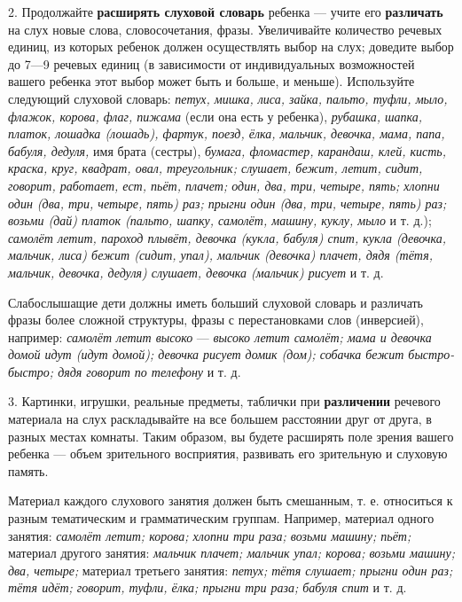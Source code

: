 \documentclass[a5paper]{book}
\renewcommand{\emph}[1]{\textit{#1}}
\begin{document}
2. Продолжайте \textbf{расширять слуховой словарь} ребенка --- учите его
\textbf{различать} на слух новые слова, словосочетания, фразы.
Увеличивайте количество речевых единиц, из которых ребенок должен
осуществлять выбор на слух; доведите выбор до 7---9 речевых единиц (в
зависимости от индивидуальных возможностей вашего ребенка этот выбор
может быть и больше, и меньше). Используйте следующий слуховой словарь:
\emph{петух, мишка, лиса, зайка, пальто, туфли, мыло, флажок, корова,
флаг, пижама} (если она есть у ребенка), \emph{рубашка, шапка, платок,
лошадка (лошадь), фартук, поезд, ёлка, мальчик, девочка, мама, папа,
бабуля, дедуля,} имя брата (сестры), \emph{бумага, фломастер, карандаш,
клей, кисть, краска, круг, квадрат, овал, треугольник; слушает, бежит,
летит, сидит, говорит, работает, ест, пьёт, плачет; один, два, три,
четыре, пять; хлопни один (два, три, четыре, пять) раз; прыгни один
(два, три, четыре, пять) раз; возьми (дай) платок (пальто, шапку,
самолёт, машину, куклу, мыло} и т. д.); \emph{самолёт летит, пароход
плывёт, девочка (кукла, бабуля) спит, кукла (девочка, мальчик, лиса)
бежит (сидит, упал), мальчик (девочка) плачет, дядя (тётя, мальчик,
девочка, дедуля) слушает, девочка (мальчик) рисует} и т. д.

Слабослышащие дети должны иметь больший слуховой словарь и различать
фразы более сложной структуры, фразы с перестановками слов (инверсией),
например: \emph{самолёт летит высоко} --- \emph{высоко летит самолёт;
мама и девочка домой идут (идут домой); девочка рисует домик (дом);
собачка бежит быстро-быстро; дядя говорит по телефону} и т. д.

3. Картинки, игрушки, реальные предметы, таблички при
\textbf{различении} речевого материала на слух раскладывайте на все
большем расстоянии друг от друга, в разных местах комнаты. Таким
образом, вы будете расширять поле зрения вашего ребенка --- объем
зрительного восприятия, развивать его зрительную и слуховую память.

Материал каждого слухового занятия должен быть смешанным, т. е.
относиться к разным тематическим и грамматическим группам. Например,
материал одного занятия: \emph{самолёт летит; корова; хлопни три раза;
возьми машину; пьёт;} материал другого занятия: \emph{мальчик плачет;
мальчик упал; корова; возьми машину; два, четыре;} материал третьего
занятия: \emph{петух; тётя слушает; прыгни один раз; тётя идёт; говорит,
туфли, ёлка; прыгни три раза; бабуля спит} и т. д.
\end{document}
